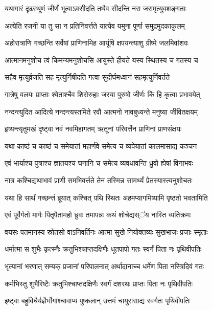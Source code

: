 \twolineshloka
{यथागारं दृढस्थूणं जीर्णं भूत्वाऽवसीदति}
{तथैव सीदन्ति नरा जरामृत्युवशङ्गताः} %

\twolineshloka
{अत्येति रजनी या तु सा न प्रतिनिवर्त्तते}
{यात्येव यमुना पूर्णा समुद्रमुदकाकुलम्} %

\twolineshloka
{अहोरात्राणि गच्छन्ति सर्वेषां प्राणिनामिह}
{आयूंषि क्षपयन्त्याशु ग्रीष्मे जलमिवांशवः} %

\twolineshloka
{आत्मानमनुशोच त्वं किमन्यमनुशोचसि}
{आयुस्ते हीयते यस्य स्थितस्य च गतस्य च} %

\twolineshloka
{सहैव मृत्युर्व्रजति सह मृत्युर्निषीदति}
{गत्वा सुदीर्घमध्वानं सहमृत्युर्निवर्तते} %

\twolineshloka
{गात्रेषु वलयः प्राप्ताः श्वेताश्चैव शिरोरुहाः}
{जरया पुरुषो जीर्णः किं हि कृत्वा प्रभावयेत्} %

\twolineshloka
{नन्दन्त्युदित आदित्ये नन्दन्त्यस्तमिते रवौ}
{आत्मनो नावबुध्यन्ते मनुष्या जीवितक्षयम्} %

\twolineshloka
{हृष्यन्त्यृतुमखं दृष्ट्वा नवं नवमिहागतम्}
{ऋतूनां परिवर्त्तेन प्राणिनां प्राणसंक्षयः} %

\twolineshloka
{यथा काष्ठं च काष्ठं च समेयातां महार्णवे}
{समेत्य च व्यपेयातां कालमासाद्य कञ्चन} %

\twolineshloka
{एवं भार्याश्च पुत्राश्च ज्ञातयश्च घनानि च}
{समेत्य व्यवधावन्ति ध्रुवो ह्येषां विनाभवः} %

\twolineshloka
{नात्र कश्चिद्यथाभावं प्राणी समभिवर्त्तते}
{तेन तस्मिन्न सामर्थ्यं प्रेतस्यास्त्यनुशोचतः} %

\twolineshloka
{यथा हि सार्थं गच्छन्तं ब्रूयात् कश्चित् पथि स्थितः}
{अहमप्यागमिष्यामि पृष्ठतो भवतामिति} %

\twolineshloka
{एवं पूर्वैर्गतो मार्गः पितृपैतामहो ध्रुवः}
{तमापन्नः कथं शोचेद्यस्ऺय नास्ति व्यतिक्रमः} %

\twolineshloka
{वयसः पतमानस्य स्रोतसो वाऽनिवर्तिनः}
{आत्मा सुखे नियोक्तव्यः सुखभाजः प्रजाः स्मृताः} %

\twolineshloka
{धर्मात्मा स शुभैः कृत्स्नैः क्रतुभिश्चाप्तदक्षिणैः}
{धूतपापो गतः स्वर्गं पिता नः पृथिवीपतिः} %

\twolineshloka
{भृत्यानां भरणात् सम्यक् प्रजानां परिपालनात्}
{अर्थादानाच्च धर्मेण पिता नस्त्रिदिवं गतः} %

\twolineshloka
{कर्मभिस्तु शुभैरिष्टैः क्रतुभिश्चाप्तदक्षिणैः}
{स्वर्गं दशरथः प्राप्तः पिता नः पृथिवीपतिः} %

\twolineshloka
{इष्ट्वा बहुविधैर्यज्ञैर्भोगांश्चावाप्य पुष्कलान्}
{उत्तमं चायुरासाद्य स्वर्गतः पृथिवीपतिः} %

